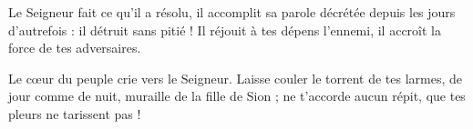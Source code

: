 Le Seigneur fait ce qu’il a résolu, il accomplit sa parole décrétée depuis les jours d’autrefois : il détruit sans pitié ! Il réjouit à tes dépens l’ennemi, il accroît la force de tes adversaires.

Le cœur du peuple crie vers le Seigneur. Laisse couler le torrent de tes larmes, de jour comme de nuit, muraille de la fille de Sion ; ne t’accorde aucun répit, que tes pleurs ne tarissent pas !
